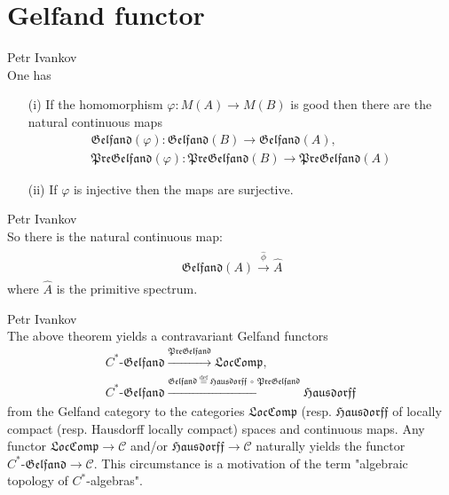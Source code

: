 \documentclass{beamer}
\theoremstyle{plain}
\newcommand{\bean}{\begin{eqnarray*}}
\newcommand{\eean}{\end{eqnarray*}}
\newcommand{\bydef}{\stackrel{\mathrm{def}}{=}}
\begin{document}
	\section{Gelfand functor}
\begin{frame}
	\begin{theorem}\alert{Petr Ivankov}\\
	One has
	\begin{enumerate}
		\item [(i)] 	If the  homomorphism $\varphi : M\left( A\right) \to M\left( B\right)$ is good 	  then there are the natural continuous maps
		\bean
		\mathfrak{Gelfand}\left(\varphi \right) :	\mathfrak{Gelfand}\left( B\right) \to \mathfrak{Gelfand}\left( A\right),\\
		\mathfrak{PreGelfand}\left(\varphi \right) :	\mathfrak{PreGelfand}\left( B\right) \to \mathfrak{PreGelfand}\left( A\right) 
		\eean
		
		\item[(ii)] If $\varphi$ is injective then the maps are surjective.
	\end{enumerate}
	
\end{theorem}
\begin{lemma}\alert{Petr Ivankov}\\
	So there is the natural continuous map:
\bean\
\begin{split}
	\mathfrak{Gelfand}\left(A \right) \xrightarrow{\hat \phi} \hat A
\end{split}
\eean
where $\hat A$ is the primitive spectrum.
\end{lemma}

\end{frame}
\begin{frame}
		\begin{definition}\label{gelfand_functor_defn}\alert{Petr Ivankov}\\
		The above theorem  yields  a contravariant \alert{Gelfand functors} 		\bean\label{gelfand_functor_eqn}
		C^*\text{-}\mathfrak{Gelfand}\xrightarrow{\mathfrak{PreGelfand}}\mathfrak{LocComp},\\\label{gelfand_h_functor_eqn}
		C^*\text{-}\mathfrak{Gelfand}\xrightarrow{\mathfrak{Gelfand} \bydef \mathfrak{Hausdorff}~\circ~\mathfrak{PreGelfand}}\mathfrak{Hausdorff}
		\eean
	from	the Gelfand category  to the categories   $\mathfrak{LocComp}$ (resp. $\mathfrak{Hausdorff}$ of locally compact (resp. Hausdorff locally compact) spaces and continuous maps.  
		Any functor  $\mathfrak{LocComp}\to \mathscr C$ and/or $\mathfrak{Hausdorff}\to \mathscr C$ naturally yields the functor $ C^*\text{-}\mathfrak{Gelfand}
		\to \mathscr C$. This circumstance is a motivation of the term "algebraic topology of $C^*$-algebras".
	\end{definition}

\end{frame}
\end{document}
